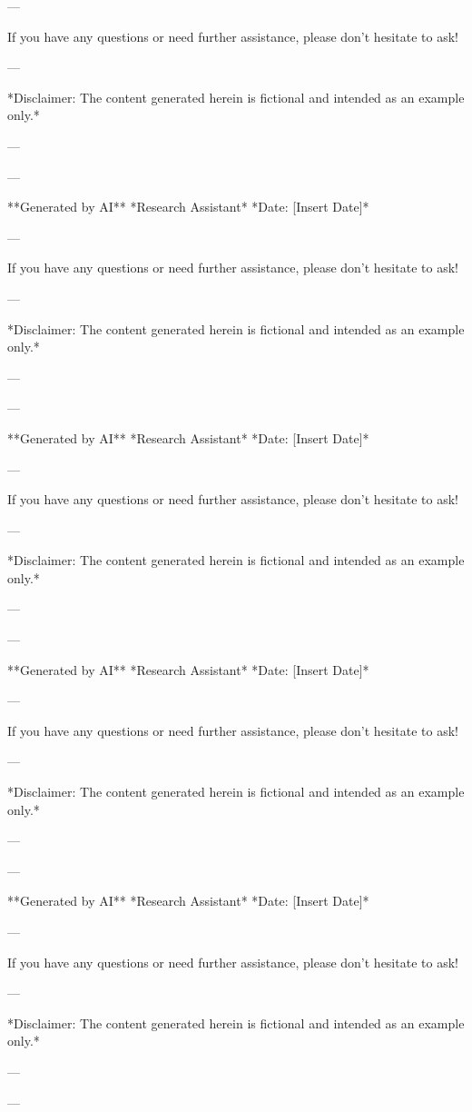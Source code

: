 --- 

If you have any questions or need further assistance, please don't hesitate to ask! 

--- 

*Disclaimer: The content generated herein is fictional and intended as an example only.* 

--- 

--- 

**Generated by AI** 
*Research Assistant* 
*Date: [Insert Date]*

--- 

If you have any questions or need further assistance, please don't hesitate to ask! 

--- 

*Disclaimer: The content generated herein is fictional and intended as an example only.* 

--- 

--- 

**Generated by AI** 
*Research Assistant* 
*Date: [Insert Date]*

--- 

If you have any questions or need further assistance, please don't hesitate to ask! 

--- 

*Disclaimer: The content generated herein is fictional and intended as an example only.* 

--- 

--- 

**Generated by AI** 
*Research Assistant* 
*Date: [Insert Date]*

--- 

If you have any questions or need further assistance, please don't hesitate to ask! 

--- 

*Disclaimer: The content generated herein is fictional and intended as an example only.* 

--- 

--- 

**Generated by AI** 
*Research Assistant* 
*Date: [Insert Date]*

--- 

If you have any questions or need further assistance, please don't hesitate to ask! 

--- 

*Disclaimer: The content generated herein is fictional and intended as an example only.* 

--- 

--- 

